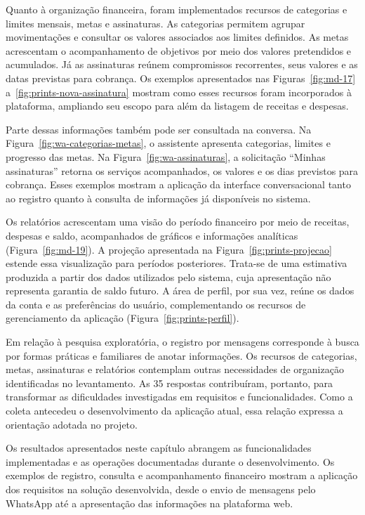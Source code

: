 Quanto à organização financeira, foram implementados recursos de categorias e limites mensais, metas e assinaturas. As categorias permitem agrupar movimentações e consultar os valores associados aos limites definidos. As metas acrescentam o acompanhamento de objetivos por meio dos valores pretendidos e acumulados. Já as assinaturas reúnem compromissos recorrentes, seus valores e as datas previstas para cobrança. Os exemplos apresentados nas Figuras~\ref{fig:md-17} a~\ref{fig:prints-nova-assinatura} mostram como esses recursos foram incorporados à plataforma, ampliando seu escopo para além da listagem de receitas e despesas.

Parte dessas informações também pode ser consultada na conversa. Na Figura~\ref{fig:wa-categorias-metas}, o assistente apresenta categorias, limites e progresso das metas. Na Figura~\ref{fig:wa-assinaturas}, a solicitação ``Minhas assinaturas'' retorna os serviços acompanhados, os valores e os dias previstos para cobrança. Esses exemplos mostram a aplicação da interface conversacional tanto ao registro quanto à consulta de informações já disponíveis no sistema.

Os relatórios acrescentam uma visão do período financeiro por meio de receitas, despesas e saldo, acompanhados de gráficos e informações analíticas (Figura~\ref{fig:md-19}). A projeção apresentada na Figura~\ref{fig:prints-projecao} estende essa visualização para períodos posteriores. Trata-se de uma estimativa produzida a partir dos dados utilizados pelo sistema, cuja apresentação não representa garantia de saldo futuro. A área de perfil, por sua vez, reúne os dados da conta e as preferências do usuário, complementando os recursos de gerenciamento da aplicação (Figura~\ref{fig:prints-perfil}).

Em relação à pesquisa exploratória, o registro por mensagens corresponde à busca por formas práticas e familiares de anotar informações. Os recursos de categorias, metas, assinaturas e relatórios contemplam outras necessidades de organização identificadas no levantamento. As 35 respostas contribuíram, portanto, para transformar as dificuldades investigadas em requisitos e funcionalidades. Como a coleta antecedeu o desenvolvimento da aplicação atual, essa relação expressa a orientação adotada no projeto.

Os resultados apresentados neste capítulo abrangem as funcionalidades implementadas e as operações documentadas durante o desenvolvimento. Os exemplos de registro, consulta e acompanhamento financeiro mostram a aplicação dos requisitos na solução desenvolvida, desde o envio de mensagens pelo WhatsApp até a apresentação das informações na plataforma web.


